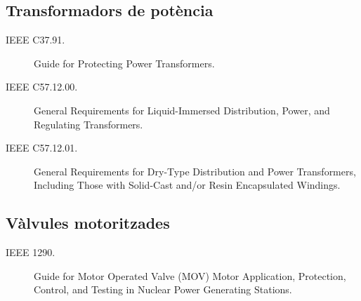 \subsection*{Transformadors de potència}
\begin{description}
    \item [\hspace{5mm}IEEE C37.91.] Guide for Protecting Power Transformers.
    \item [\hspace{5mm}IEEE C57.12.00.] General Requirements for Liquid-Immersed Distribution, Power, and Regulating Transformers.
    \item [\hspace{5mm}IEEE C57.12.01.] General Requirements for Dry-Type Distribution and Power Transformers, Including Those with Solid-Cast and/or Resin Encapsulated Windings.
\end{description}



\subsection*{Vàlvules motoritzades}
\begin{description}
    \item [\hspace{5mm}IEEE 1290.] Guide for Motor Operated Valve (MOV) Motor Application, Protection, Control, and Testing in Nuclear Power Generating Stations.
\end{description}

